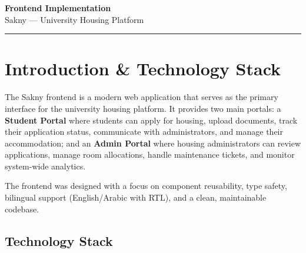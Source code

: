 \documentclass[12pt,a4paper]{article}
\begin{document}
\begin{center}
    {\LARGE\bfseries\color{codeblue} Frontend Implementation}\\[0.5em]
    {\large Sakny — University Housing Platform}\\[1em]
    \rule{0.6\textwidth}{0.5pt}
\end{center}

\tableofcontents
\newpage

\section{Introduction \& Technology Stack}

The Sakny frontend is a modern web application that serves as the primary interface for the university housing platform. It provides two main portals: a \textbf{Student Portal} where students can apply for housing, upload documents, track their application status, communicate with administrators, and manage their accommodation; and an \textbf{Admin Portal} where housing administrators can review applications, manage room allocations, handle maintenance tickets, and monitor system-wide analytics.

The frontend was designed with a focus on component reusability, type safety, bilingual support (English/Arabic with RTL), and a clean, maintainable codebase.

\subsection{Technology Stack}
\end{document}
